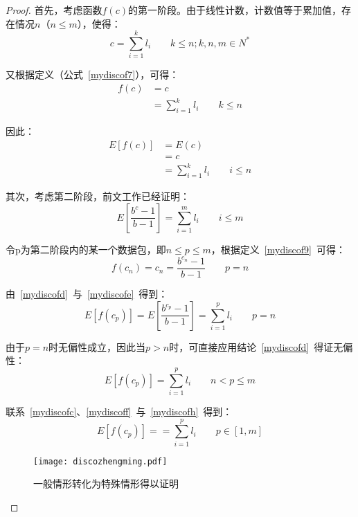 \begin{proof}
	首先，考虑函数$ f(c) $的第一阶段。由于线性计数，计数值等于累加值，存在情况$n$（$ n\leq m $），使得：
	\begin{equation} \label{mydiscofa}
	c=\sum ^{k}_{i=1}l_{i} \quad\quad k \leq n; k,n,m \in N^{\ast}
	\end{equation}
	
	又根据定义（公式~\ref{mydiscof7}），可得：
	\begin{align}\label{mydiscofb}
	f(c) &= c \nonumber \\
	&=\sum ^{k}_{i=1}l_{i} \quad\quad k \leq n
	\end{align}
	
	因此：
	\begin{align}\label{mydiscofc}
	E[f(c)] &= E(c) \nonumber \\
	&=c \nonumber  \\
	&=\sum ^{k}_{i=1}l_{i} \quad\quad i \leq n
	\end{align}
	
	其次，考虑第二阶段，前文工作已经证明：
	\begin{equation} \label{mydiscofd}
	E[\dfrac{b^c-1}{b-1}]=\sum_{i=1}^{m}l_i \quad\quad i \leq m
	\end{equation}
	
	令p为第二阶段内的某一个数据包，即$ n \leq p \leq m $，根据定义~\ref{mydiscof9}~可得：
	\begin{equation} \label{mydiscofe}
		f(c_n) = c_n = \dfrac{b^{c_n}-1}{b-1}\quad\quad p=n
	\end{equation}
	
	由~\ref{mydiscofd}~与~\ref{mydiscofe}~得到：
	\begin{equation} \label{mydiscoff}
	E[f(c_p)]=E[\dfrac{b^{c_p}-1}{b-1}]=\sum_{i=1}^{p}l_i\quad\quad p=n
	\end{equation}
	
	由于$p=n$时无偏性成立，因此当$p>n$时，可直接应用结论~\ref{mydiscofd}~得证无偏性：
	\begin{equation} \label{mydiscofh}
	E[f(c_p)]  = \sum_{i=1}^{p}l_i \quad\quad n<p\leq m
	\end{equation}
	
	联系~\ref{mydiscofc}、\ref{mydiscoff}~与~\ref{mydiscofh}~得到：
	\begin{equation} \label{mydiscofg}
	E[f(c_p)]==\sum_{i=1}^{p}l_i\quad\quad p \in [1,m]
	\end{equation}
	
	\begin{figure}[!ht]
		\centering 
		\vspace{-1.5mm}
		\texttt{[image: discozhengming.pdf]}
		\caption{一般情形转化为特殊情形得以证明} \label{fig:discozhengming}
	\end{figure}
	

\end{proof}
